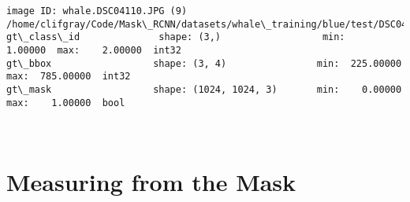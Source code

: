 \documentclass[11pt]{article}
\begin{document}
    \begin{Verbatim}[commandchars=\\\{\}]
image ID: whale.DSC04110.JPG (9) /home/clifgray/Code/Mask\_RCNN/datasets/whale\_training/blue/test/DSC04110.JPG
gt\_class\_id              shape: (3,)                  min:    1.00000  max:    2.00000  int32
gt\_bbox                  shape: (3, 4)                min:  225.00000  max:  785.00000  int32
gt\_mask                  shape: (1024, 1024, 3)       min:    0.00000  max:    1.00000  bool

    \end{Verbatim}

    \begin{center}
    \end{center}
    { \hspace*{\fill} \\}
    
    \hypertarget{measuring-from-the-mask}{%
\section{Measuring from the Mask}\label{measuring-from-the-mask}}
\end{document}
